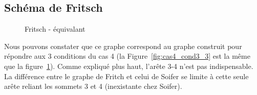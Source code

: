 \subsection{Schéma de Fritsch}
\begin{figure}[!h]\centering
	\begin{changemargin}{-3cm}{-3cm}
		\begin{center}
			
			\hspace{15pt}
			
			\hspace{15pt}
			
		\end{center}
	\end{changemargin}
\end{figure}
\FloatBarrier	

\begin{figure}[!h]\centering
	\begin{changemargin}{-3cm}{-3cm}
		\begin{center}
			
			\hspace{15pt}
			
			\caption{Fritsch - équivalant}
			\label{fig:Fritsch_anamorphose}
		\end{center}
	\end{changemargin}
\end{figure}
\FloatBarrier	
Nous pouvons constater que ce graphe correspond au graphe construit pour répondre aux 3 conditions du cas 4 (la Figure~\ref{fig:cas4_cond3_3} est la même que la figure~\ref{fig:Fritsch_anamorphose}). 
Comme expliqué plus haut, l’arête 3-4 n'est pas indispensable.
La différence entre le graphe de Fritch et celui de Soifer se limite à cette seule arête reliant les sommets 3 et 4 (inexistante chez Soifer).\\





